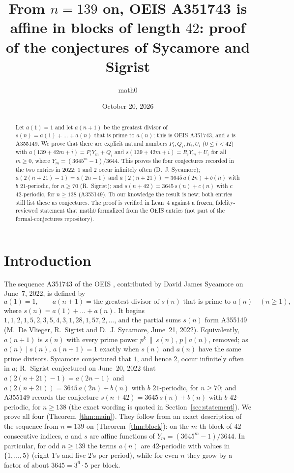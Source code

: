 \documentclass[11pt]{amsart}
\title[The affine 42-block structure of OEIS A351743]{From $n=139$ on, OEIS A351743 is affine in blocks of length $42$: proof of the conjectures of Sycamore and Sigrist}
\author{math0}
\date{October 20, 2026}
\theoremstyle{plain}
\theoremstyle{definition}
\begin{document}
\begin{abstract}
Let $a(1)=1$ and let $a(n+1)$ be the greatest divisor of $s(n)=a(1)+\dots+a(n)$ that is prime to $a(n)$; this is OEIS A351743, and $s$ is A355149.
We prove that there are explicit natural numbers $P_i,Q_i,R_i,U_i$ ($0\le i<42$) with $a(139+42m+i)=P_iY_m+Q_i$ and $s(139+42m+i)=R_iY_m+U_i$ for all $m\ge0$, where $Y_m=(3645^m-1)/3644$.
This proves the four conjectures recorded in the two entries in 2022: $1$ and $2$ occur infinitely often (D.~J. Sycamore); $a(2(n+21)-1)=a(2n-1)$ and $a(2(n+21))=3645\,a(2n)+b(n)$ with $b$ $21$-periodic, for $n\ge70$ (R.~Sigrist); and $s(n+42)=3645\,s(n)+c(n)$ with $c$ $42$-periodic, for $n\ge138$ (A355149).
To our knowledge the result is new; both entries still list these as conjectures.
The proof is verified in Lean~4 against a frozen, fidelity-reviewed statement that math0 formalized from the OEIS entries (not part of the formal-conjectures repository).
\end{abstract}
\maketitle

\section{Introduction}

The sequence A351743 of the OEIS \cite{A351743}, contributed by David James Sycamore on June~7, 2022, is defined by
\[
  a(1)=1,\qquad a(n+1)=\text{the greatest divisor of } s(n) \text{ that is prime to } a(n)\quad(n\ge1),
\]
where $s(n)=a(1)+\dots+a(n)$. It begins $1,1,2,1,5,2,3,5,4,3,1,28,1,57,2,\dots$, and the partial sums $s(n)$ form A355149 \cite{A355149} (M.~De Vlieger, R.~Sigrist and D.~J. Sycamore, June~21, 2022).
Equivalently, $a(n+1)$ is $s(n)$ with every prime power $p^k\,\|\,s(n)$, $p\mid a(n)$, removed; as $a(n)\mid s(n)$, $a(n+1)=1$ exactly when $s(n)$ and $a(n)$ have the same prime divisors.
Sycamore conjectured that $1$, and hence $2$, occur infinitely often in $a$; R.~Sigrist conjectured on June~20, 2022 that $a(2(n+21)-1)=a(2n-1)$ and $a(2(n+21))=3645\,a(2n)+b(n)$ with $b$ $21$-periodic, for $n\ge70$; and A355149 records the conjecture $s(n+42)=3645\,s(n)+b(n)$ with $b$ $42$-periodic, for $n\ge138$ (the exact wording is quoted in Section~\ref{sec:statement}).
We prove all four (Theorem~\ref{thm:main}). They follow from an exact description of the sequence from $n=139$ on (Theorem~\ref{thm:block}): on the $m$-th block of $42$ consecutive indices, $a$ and $s$ are affine functions of $Y_m=(3645^m-1)/3644$.
In particular, for odd $n\ge139$ the terms $a(n)$ are $42$-periodic with values in $\{1,\dots,5\}$ (eight $1$'s and five $2$'s per period), while for even $n$ they grow by a factor of about $3645=3^6\cdot5$ per block.
\end{document}
